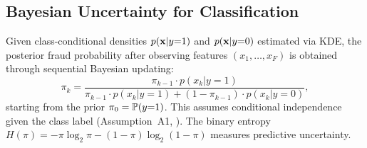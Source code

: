\subsection{Bayesian Uncertainty for Classification}
\label{sec:bg_bayes}

Given class-conditional densities $p(\mathbf{x} | y{=}1)$ and $p(\mathbf{x} | y{=}0)$ estimated via KDE, the posterior fraud probability after observing features $(x_1, \ldots, x_F)$ is obtained through sequential Bayesian updating:
\begin{equation}
    \pi_k = \frac{\pi_{k-1} \cdot p(x_k | y{=}1)}{\pi_{k-1} \cdot p(x_k | y{=}1) + (1 - \pi_{k-1}) \cdot p(x_k | y{=}0)},
    \label{eq:bayes_update}
\end{equation}
starting from the prior $\pi_0 = \mathbb{P}(y{=}1)$. This assumes conditional independence given the class label (Assumption~A1, ). The binary entropy $H(\pi) = -\pi \log_2 \pi - (1{-}\pi) \log_2 (1{-}\pi)$ measures predictive uncertainty.
